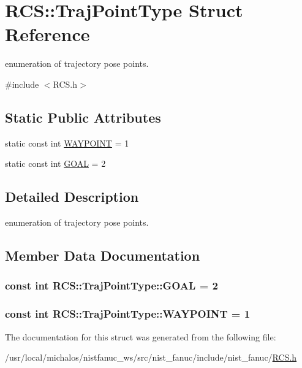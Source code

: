 \hypertarget{structRCS_1_1TrajPointType}{\section{R\-C\-S\-:\-:Traj\-Point\-Type Struct Reference}
\label{structRCS_1_1TrajPointType}
}


enumeration of trajectory pose points.  




{\ttfamily \#include $<$R\-C\-S.\-h$>$}

\subsection*{Static Public Attributes}
\begin{DoxyCompactItemize}
\item 
static const int \hyperlink{structRCS_1_1TrajPointType_a9c8aa98e61c4a0766ec829fb9c39e80f}{W\-A\-Y\-P\-O\-I\-N\-T} = 1
\item 
static const int \hyperlink{structRCS_1_1TrajPointType_a78f0ad48aa60704b956349f793b7b7e2}{G\-O\-A\-L} = 2
\end{DoxyCompactItemize}


\subsection{Detailed Description}
enumeration of trajectory pose points. 

\subsection{Member Data Documentation}
\hypertarget{structRCS_1_1TrajPointType_a78f0ad48aa60704b956349f793b7b7e2}{
\subsubsection[{G\-O\-A\-L}]{\setlength{\rightskip}{0pt plus 5cm}const int R\-C\-S\-::\-Traj\-Point\-Type\-::\-G\-O\-A\-L = 2\hspace{0.3cm}{\ttfamily [static]}}}\label{structRCS_1_1TrajPointType_a78f0ad48aa60704b956349f793b7b7e2}
\hypertarget{structRCS_1_1TrajPointType_a9c8aa98e61c4a0766ec829fb9c39e80f}{
\subsubsection[{W\-A\-Y\-P\-O\-I\-N\-T}]{\setlength{\rightskip}{0pt plus 5cm}const int R\-C\-S\-::\-Traj\-Point\-Type\-::\-W\-A\-Y\-P\-O\-I\-N\-T = 1\hspace{0.3cm}{\ttfamily [static]}}}\label{structRCS_1_1TrajPointType_a9c8aa98e61c4a0766ec829fb9c39e80f}


The documentation for this struct was generated from the following file\-:\begin{DoxyCompactItemize}
\item 
/usr/local/michalos/nistfanuc\-\_\-ws/src/nist\-\_\-fanuc/include/nist\-\_\-fanuc/\hyperlink{RCS_8h}{R\-C\-S.\-h}\end{DoxyCompactItemize}
